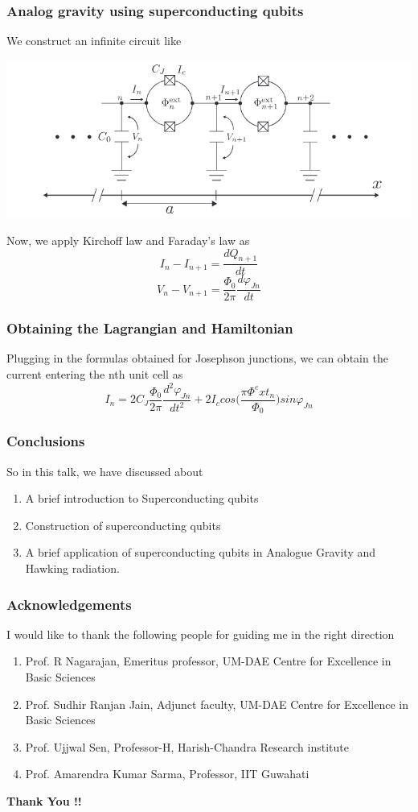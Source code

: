 \documentclass[11pt]{beamer}
\begin{document}
	\begin{frame}
		\frametitle{Analog gravity using superconducting qubits}
		We construct an infinite circuit like
		\begin{center}
			\includegraphics[width=8 cm]{sc9.png}
		\end{center}
		Now, we apply Kirchoff law and Faraday's law as
		\[I_n - I_{n+1}=\frac{dQ_{n+1}}{dt}\]
		\[V_n-V_{n+1}=\frac{\Phi_0}{2\pi}\frac{d\varphi_{Jn}}{dt}\]
	\end{frame}
	
		\begin{frame}
		\frametitle{Obtaining the Lagrangian and Hamiltonian}
Plugging in the formulas obtained for Josephson junctions, we can obtain the current entering the nth unit cell as
\[I_n=2 C_J \frac{\Phi_0}{2\pi}\frac{d^2\varphi_{Jn}}{dt^2}+2I_ccos\bigg(\frac{\pi \Phi^ext_n}{\Phi_0}\bigg)sin\varphi_{Jn}\]
	\end{frame}
	
		\begin{frame}
		\frametitle{Conclusions}
		So in this talk, we have discussed about
		\begin{enumerate}
			\item A brief introduction to Superconducting qubits
			\item  Construction of superconducting qubits
			\item  A brief application of superconducting qubits in Analogue Gravity and Hawking radiation.
			
		\end{enumerate}
	\end{frame}
	
			\begin{frame}
		\frametitle{Acknowledgements}
		I would like to thank the following people for guiding me in the right direction
		\begin{enumerate}
			\item Prof. R Nagarajan, Emeritus professor, UM-DAE Centre for Excellence in Basic Sciences
			\item Prof. Sudhir Ranjan Jain, Adjunct faculty, UM-DAE Centre for Excellence in Basic Sciences
			\item Prof. Ujjwal Sen, Professor-H, Harish-Chandra Research institute
			\item  Prof. Amarendra Kumar Sarma, Professor, IIT Guwahati
		\end{enumerate}
	\end{frame}
	
	\begin{frame}
		\begin{center}
			\LARGE\textbf{Thank You !!}
		\end{center}
	
	\end{frame}
\end{document}
